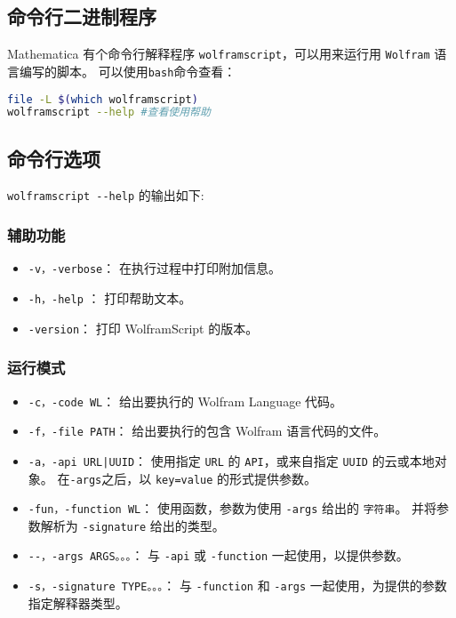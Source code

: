 
\begin{issues}
\issueDraft
\issueTODO
\end{issues}

\subsection{命令行二进制程序}

Mathematica 有个命令行解释程序 \verb`wolframscript`，可以用来运行用 \verb`Wolfram` 语言编写的脚本。
可以使用\verb`bash`命令查看：
\begin{lstlisting}[language=bash]
file -L $(which wolframscript)
wolframscript --help #查看使用帮助
\end{lstlisting}

\subsection{命令行选项} 

\verb`wolframscript --help` 的输出如下:

\subsubsection{辅助功能} 
\begin{itemize}
\item \verb`-v，-verbose`： 在执行过程中打印附加信息。
\item \verb`-h，-help` ： 打印帮助文本。
\item \verb`-version`： 打印 WolframScript 的版本。
\end{itemize}

\subsubsection{运行模式} 
\begin{itemize}
\item \verb`-c，-code WL`： 给出要执行的 Wolfram Language 代码。
\item \verb`-f，-file PATH`： 给出要执行的包含 Wolfram 语言代码的文件。
\item \verb`-a，-api URL|UUID`： 使用指定 \verb`URL` 的 \verb`API`，或来自指定 \verb`UUID` 的云或本地对象。 
在\verb`-args`之后，以 \verb`key=value` 的形式提供参数。
\item \verb`-fun，-function WL`： 使用函数，参数为使用 \verb`-args` 给出的 \verb`字符串`。
并将参数解析为 \verb`-signature` 给出的类型。
\item \verb`--，-args ARGS。。。`： 与 \verb`-api` 或 \verb`-function` 一起使用，以提供参数。
\item \verb`-s，-signature TYPE。。。`： 与 \verb`-function` 和 \verb`-args` 一起使用，为提供的参数指定解释器类型。
\end{itemize}

